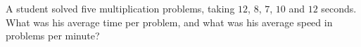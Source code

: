 A student solved five multiplication problems, taking $12$, $8$, $7$, $10$ and $12$ seconds. What was his average time per problem, and what was his average speed in problems per minute?
